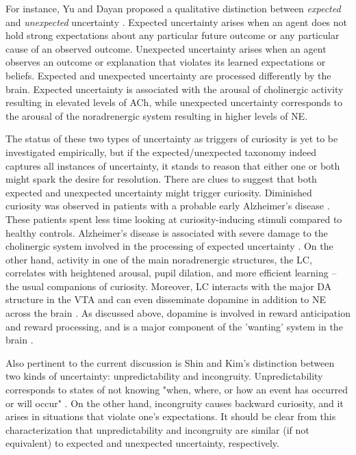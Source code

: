 For instance, Yu and Dayan proposed a qualitative distinction between \emph{expected} and \emph{unexpected} uncertainty \cite{yu_expected_2003,yu_uncertainty_2005}. Expected uncertainty arises when an agent does not hold strong expectations about any particular future outcome or any particular cause of an observed outcome. Unexpected uncertainty arises when an agent observes an outcome or explanation that violates its learned expectations or beliefs. Expected and unexpected uncertainty are processed differently by the brain. Expected uncertainty is associated with the arousal of cholinergic activity resulting in elevated levels of \ac{ACh}, while unexpected uncertainty corresponds to the arousal of the noradrenergic system resulting in higher levels of \ac{NE}.

The status of these two types of uncertainty as triggers of curiosity is yet to be investigated empirically, but if the expected/unexpected taxonomy indeed captures all instances of uncertainty, it stands to reason that either one or both might spark the desire for resolution. There are clues to suggest that both expected and unexpected uncertainty might trigger curiosity. Diminished curiosity was observed in patients with a probable early Alzheimer's disease \cite{daffner_diminished_1992}. These patients spent less time looking at curiosity-inducing stimuli compared to healthy controls. Alzheimer's disease is associated with severe damage to the cholinergic system \cite{ferreira-vieira_alzheimers_2016} involved in the processing of expected uncertainty \cite{yu_uncertainty_2005}. On the other hand, activity in one of the main noradrenergic structures, the \ac{LC}, correlates with heightened arousal, pupil dilation, and more efficient learning \cite{breton-provencher_locus_2021} -- the usual companions of curiosity. Moreover, \ac{LC} interacts with the major DA structure in the \ac{VTA} and can even disseminate dopamine in addition to \ac{NE} across the brain \cite{ranjbar-slamloo_dopamine_2020}. As discussed above, dopamine is involved in reward anticipation and reward processing, and is a major component of the 'wanting' system in the brain \cite{berridge_debate_2007}.

Also pertinent to the current discussion is Shin and Kim's \cite{shin_homo_2019} distinction between two kinds of uncertainty: unpredictability and incongruity. Unpredictability corresponds to states of not knowing "when, where, or how an event has occurred or will occur" \cite[][p. 13]{shin_homo_2019}. On the other hand, incongruity causes backward curiosity, and it arises in situations that violate one's expectations. It should be clear from this characterization that unpredictability and incongruity are similar (if not equivalent) to expected and unexpected uncertainty, respectively.

